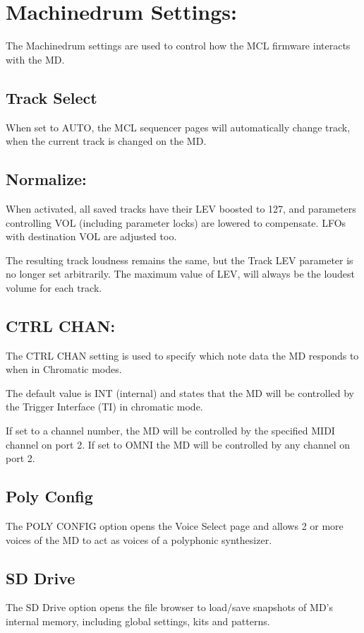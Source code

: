 \chapter{Machinedrum Settings:}
The Machinedrum settings are used to control how the MCL firmware interacts with the MD.
\section{Track Select}
When set to AUTO, the MCL sequencer pages will automatically change track, when the current track is changed on the MD.

\section{Normalize:}
When activated, all saved tracks have their LEV boosted to 127, and parameters controlling VOL (including parameter locks) are lowered
to compensate. LFOs with destination VOL are 
adjusted too.

The resulting track loudness remains the same, but the Track LEV parameter is no longer set arbitrarily. The maximum value of LEV, will always be the loudest volume for each track.
\section{CTRL CHAN:}
The CTRL CHAN setting is used to specify which note data the MD responds to when in Chromatic modes.

The default value is INT (internal) and states that the MD will be controlled by the Trigger Interface (TI) in chromatic mode.

If set to a channel number, the MD will be controlled by the specified MIDI channel on port 2. If set to OMNI the MD will be controlled by any channel on port 2.
\section{Poly Config}
The POLY CONFIG option opens the Voice Select page and allows 2 or more voices of the MD to act as voices of a polyphonic synthesizer.
\section{SD Drive}
The SD Drive option opens the file browser to load/save snapshots of MD's internal memory, including global settings, kits and patterns.